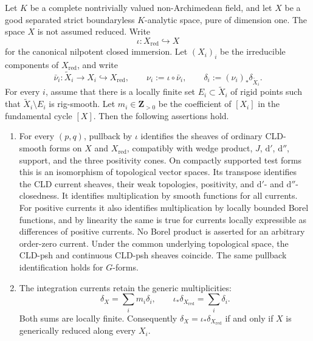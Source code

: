 
\begin{proposition}
\label{prop:p21p3-componentwise-rigid-exceptions}
Let $K$ be a complete nontrivially valued non-Archimedean field, and let $X$
be a good separated strict boundaryless $K$-analytic space, pure of dimension
one.
The space $X$ is not assumed reduced.  Write
\[
                 \iota:X_{\mathrm{red}}\hookrightarrow X
\]
for the canonical nilpotent closed immersion.  Let $(X_i)_i$ be the
irreducible components of $X_{\mathrm{red}}$, and write
\[
 \bar\nu_i:\widetilde X_i\longrightarrow X_i
       \hookrightarrow X_{\mathrm{red}},
 \qquad
 \nu_i:=\iota\circ\bar\nu_i,
 \qquad
 \delta_i:=(\nu_i)_*\delta_{\widetilde X_i}.
\]
For every $i$, assume that there is a locally finite set
$E_i\subset\widetilde X_i$ of rigid points such that
$\widetilde X_i\setminus E_i$ is rig-smooth.  Let
$m_i\in\mathbf Z_{>0}$ be the coefficient of $[X_i]$ in the fundamental
cycle $[X]$.  Then the following assertions hold.

\begin{enumerate}
\item\label{itm:p21p3-componentwise:calculus}
For every $(p,q)$, pullback by $\iota$ identifies the sheaves of ordinary
CLD-smooth forms on $X$ and $X_{\mathrm{red}}$, compatibly with wedge
product, $J$, $\mathrm d'$, $\mathrm d''$, support, and the three positivity
cones.  On compactly supported test forms this is an isomorphism of
topological vector spaces.  Its transpose identifies the CLD current
sheaves, their weak topologies, positivity, and
$\mathrm d'$- and $\mathrm d''$-closedness.  It identifies multiplication
by smooth functions for all currents.  For positive currents it also
identifies multiplication by locally bounded Borel functions, and by
linearity the same is true for currents locally expressible as differences
of positive currents.  No Borel product is asserted for an arbitrary
order-zero current.  Under the common underlying topological space, the
CLD-psh and continuous CLD-psh sheaves coincide.  The same pullback
identification holds for $G$-forms.

\item\label{itm:p21p3-componentwise:integration}
The integration currents retain the generic multiplicities:
\begin{equation}
 \label{eq:p21p3-componentwise-fundamental-cycles}
       \delta_X=\sum_i m_i\delta_i,
       \qquad
       \iota_*\delta_{X_{\mathrm{red}}}=\sum_i\delta_i.
\end{equation}
Both sums are locally finite.  Consequently
$\delta_X=\iota_*\delta_{X_{\mathrm{red}}}$ if and only if $X$ is
generically reduced along every $X_i$.


\end{enumerate}
\end{proposition}
